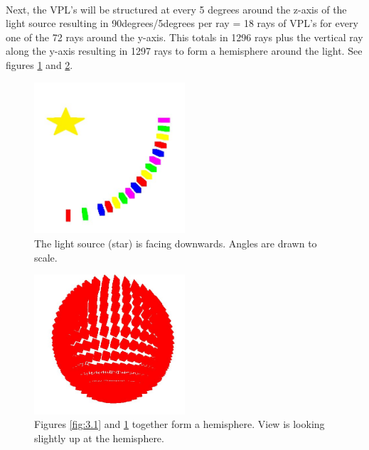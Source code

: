 \paragraph{}
Next, the VPL's will be structured at every 5 degrees around the z-axis of the light source resulting in 90degrees/5degrees per ray = 18 rays of VPL's for every one of the 72 rays around the y-axis.  This totals in 1296 rays plus the vertical ray along the y-axis resulting in 1297 rays to form a hemisphere around the light. See figures \ref{fig:3.2} and \ref{fig:3.3}.

\begin{figure}[h!]
  \centering
    \includegraphics[width=0.5\textwidth]{Figure32.jpg}
  \caption{The light source (star) is facing downwards. Angles are drawn to scale.}
	\label{fig:3.2}
\end{figure}


\begin{figure}[h!]
  \centering
    \includegraphics[width=0.5\textwidth]{Figure33.jpg}
  \caption{Figures \ref{fig:3.1} and \ref{fig:3.2} together form a hemisphere. View is looking slightly up at the hemisphere.}
	\label{fig:3.3}
\end{figure}

